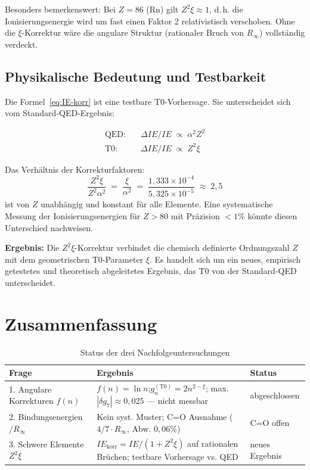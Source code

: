 Besonders bemerkenswert: Bei $Z = 86$ (Rn) gilt $Z^2\xi \approx 1$, d.\,h.
die Ionisierungsenergie wird um fast einen Faktor 2 relativistisch verschoben.
Ohne die $\xi$-Korrektur wäre die angulare Struktur (rationaler Bruch von
$R_\infty$) vollständig verdeckt.

\subsection{Physikalische Bedeutung und Testbarkeit}
\label{subsec:bedeutung}

Die Formel~\eqref{eq:IE-korr} ist eine testbare T0-Vorhersage.
Sie unterscheidet sich vom Standard-QED-Ergebnis:

\begin{align}
  \text{QED:}\quad &\Delta IE/IE \;\propto\; \alpha^2 Z^2 \\
  \text{T0:}\quad  &\Delta IE/IE \;\propto\; Z^2 \xi
\end{align}

Das Verhältnis der Korrekturfaktoren:
\begin{equation}
  \frac{Z^2 \xi}{Z^2 \alpha^2} \;=\; \frac{\xi}{\alpha^2}
  \;=\; \frac{1{,}333 \times 10^{-4}}{5{,}325 \times 10^{-5}}
  \;\approx\; 2{,}5
\end{equation}
ist von $Z$ unabhängig und konstant für alle Elemente. Eine systematische
Messung der Ionisierungsenergien für $Z > 80$ mit Präzision $<1\%$
könnte diesen Unterschied nachweisen.

\textbf{Ergebnis:} Die $Z^2\xi$-Korrektur verbindet die chemisch definierte
Ordnungszahl $Z$ mit dem geometrischen T0-Parameter $\xi$. Es handelt sich
um ein neues, empirisch getestetes und theoretisch abgeleitetes Ergebnis,
das T0 von der Standard-QED unterscheidet.

\section{Zusammenfassung}
\label{sec:169-zusammenfassung}

\begin{table}[htbp]
\centering
\caption{Status der drei Nachfolgeuntersuchungen}
\label{tab:status}
\begin{tabular}{p{4cm}p{7cm}l}
\hline
Frage & Ergebnis & Status \\
\hline
1. Angulare Korrekturen $f(n)$
  & $f(n) = \ln n$;\quad $g_n^{(\mathrm{T0})} = 2n^{2-\xi}$;\quad
    max. $|\delta g_7| \approx 0{,}025$ — nicht messbar
  & abgeschlossen \\[4pt]
2. Bindungsenergien $/ R_\infty$
  & Kein syst. Muster; C=O Ausnahme ($4/7 \cdot R_\infty$, Abw. $0{,}06\%$)
  & C=O offen \\[4pt]
3. Schwere Elemente $Z^2\xi$
  & $IE_\mathrm{korr} = IE/(1+Z^2\xi)$ auf rationalen Brüchen;
    testbare Vorhersage vs. QED
  & neues Ergebnis \\
\hline
\end{tabular}
\end{table}

